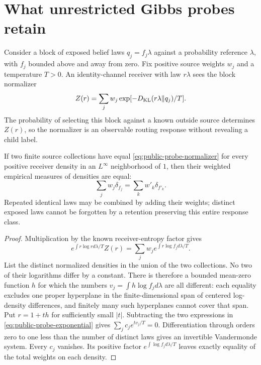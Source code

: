 \section{What unrestricted Gibbs probes retain}
\label{sec:public-gibbs-identifiability}

Consider a block of exposed belief laws $q_j=f_j\lambda$ against a probability reference $\lambda$, with $f_j$ bounded above and away from zero. Fix positive source weights $w_j$ and a temperature $T>0$. An identity-channel receiver with law $r\lambda$ sees the block normalizer
\begin{equation}
 Z(r)=\sum_jw_j\exp[-D_{\mathrm{KL}}(r\lambda\Vert q_j)/T].
 \label{eq:public-probe-normalizer}
\end{equation}
The probability of selecting this block against a known outside source determines $Z(r)$, so the normalizer is an observable routing response without revealing a child label.

If two finite source collections have equal \cref{eq:public-probe-normalizer} for every positive receiver density in an $L^\infty$ neighborhood of $1$, then their weighted empirical measures of densities are equal:
\begin{equation}
 \sum_jw_j\delta_{f_j}=\sum_kw'_k\delta_{f'_k}.
 \label{eq:public-probe-identification}
\end{equation}
Repeated identical laws may be combined by adding their weights; distinct exposed laws cannot be forgotten by a retention preserving this entire response class.

\begin{proof}
Multiplication by the known receiver-entropy factor gives
\begin{equation}
 e^{\int r\log r d\lambda/T}Z(r)
 =\sum_jw_j e^{\int r\log f_j d\lambda/T}.
 \label{eq:public-probe-exponential}
\end{equation}
List the distinct normalized densities in the union of the two collections. No two of their logarithms differ by a constant. There is therefore a bounded mean-zero function $h$ for which the numbers $v_j=\int h\log f_j d\lambda$ are all different: each equality excludes one proper hyperplane in the finite-dimensional span of centered log-density differences, and finitely many such hyperplanes cannot cover that span. Put $r=1+th$ for sufficiently small $|t|$. Subtracting the two expressions in \cref{eq:public-probe-exponential} gives $\sum_j c_j e^{tv_j/T}=0$. Differentiation through orders zero to one less than the number of distinct laws gives an invertible Vandermonde system. Every $c_j$ vanishes. Its positive factor $e^{\int\log f_j d\lambda/T}$ leaves exactly equality of the total weights on each density.
\end{proof}


